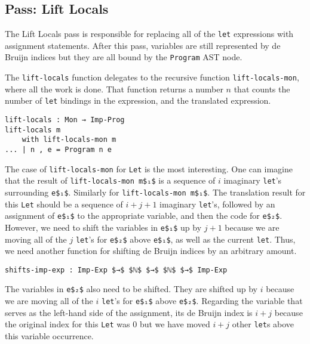 \documentclass[sigplan,review,dvipsnames,screen,10pt]{acmart}
\begin{document}
\subsection{Pass: Lift Locals}

The Lift Locals pass is responsible for replacing all of the
\lstinline{let} expressions with assignment statements.  After this
pass, variables are still represented by de Bruijn indices but they
are all bound by the \lstinline{Program} AST node.

The \lstinline{lift-locals} function delegates to the recursive
function \lstinline{lift-locals-mon}, where all the work is done.
That function returns a number $n$ that counts the number of
\lstinline{let} bindings in the expression, and the translated
expression.

\begin{lstlisting}
lift-locals : Mon → Imp-Prog
lift-locals m
    with lift-locals-mon m
... | n , e = Program n e    
\end{lstlisting}

\noindent The case of \lstinline{lift-locals-mon} for \lstinline{Let}
is the most interesting. One can imagine that the result of
\lstinline{lift-locals-mon m$₁$} is a sequence of $i$ imaginary
\lstinline{let}'s surrounding \lstinline{e$₁$}. Similarly for 
\lstinline{lift-locals-mon m$₁$}.
The translation result for this \lstinline{Let} should be
a sequence of $i + j + 1$ imaginary
\lstinline{let}'s, followed by an assignment
of \lstinline{e$₁$} to the appropriate variable, and then the
code for \lstinline{e$₂$}. However, we need to shift
the variables in \lstinline{e$₁$} up by $j + 1$ because
we are moving all of the $j$ \lstinline{let}'s for
\lstinline{e$₂$} above \lstinline{e$₁$}, as well as the
current \lstinline{let}. Thus, we need another function
for shifting de Bruijn indices by an arbitrary amount.

\begin{lstlisting}
shifts-imp-exp : Imp-Exp $→$ $ℕ$ $→$ $ℕ$ $→$ Imp-Exp
\end{lstlisting}

The variables in \lstinline{e$₂$} also need to be shifted.  They are
shifted up by $i$ because we are moving all of the $i$
\lstinline{let}'s for \lstinline{e$₁$} above
\lstinline{e$₂$}. Regarding the variable that serves as the left-hand
side of the assignment, its de Bruijn index is $i + j$ because the
original index for this \lstinline{Let} was $0$ but we have moved $i +
j$ other \lstinline{let}s above this variable occurrence.
\end{document}
